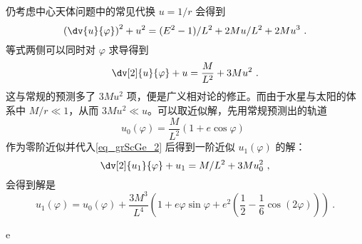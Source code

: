 仍考虑中心天体问题中的常见代换 $u = 1/r$ 会得到
\begin{equation}
\left( \dv{u}{\varphi} \right)^2 + u^2 = (E^2-1)/L^2 + 2Mu/L^2 + 2Mu^3 ~.
\end{equation}
等式两侧可以同时对 $\varphi$ 求导得到
\begin{equation}\label{eq_grScGe_2}
\dv[2]{u}{\varphi} + u = \frac{M}{L^2} + 3M u^2 ~.
\end{equation}
这与常规的预测多了 $3Mu^2$ 项，便是广义相对论的修正。而由于水星与太阳的体系中 $M/r \ll 1$，从而 $3Mu^2 \ll u$。可以取近似解，先用常规预测出的轨道
\begin{equation}
u_0(\varphi) = \frac{M}{L^2}(1 + e \cos \varphi) ~~
\end{equation}
作为零阶近似并代入\autoref{eq_grScGe_2} 后得到一阶近似 $u_1(\varphi)$ 的解：
\begin{equation}
\dv[2]{u_1}{\varphi} + u_1 = M/L^2 + 3M u_0^2 ~,
\end{equation}
会得到解是
\begin{equation}
u_1(\varphi) = u_0(\varphi) + \frac{3M^3}{L^4} \left( 1 + e\varphi \sin \varphi + e^2\left( \frac12 - \frac16 \cos(2\varphi) \right) \right) ~.
\end{equation}

e